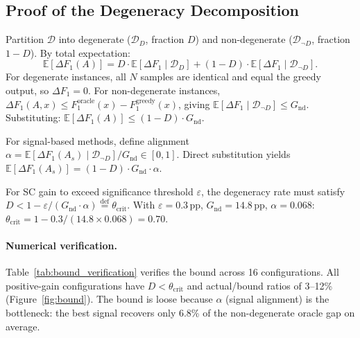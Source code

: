 \subsection{Proof of the Degeneracy Decomposition}

Partition $\mathcal{D}$ into degenerate ($\mathcal{D}_D$, fraction $D$) and non-degenerate ($\mathcal{D}_{\neg D}$, fraction $1{-}D$). By total expectation:
\begin{equation}\label{eq:bound_decomp}
\mathbb{E}[\Delta F_1(A)] = D \cdot \mathbb{E}[\Delta F_1 \mid \mathcal{D}_D] + (1{-}D) \cdot \mathbb{E}[\Delta F_1 \mid \mathcal{D}_{\neg D}].
\end{equation}
For degenerate instances, all $N$ samples are identical and equal the greedy output, so $\Delta F_1 = 0$. For non-degenerate instances, $\Delta F_1(A,x) \leq F_1^{\text{oracle}}(x) - F_1^{\text{greedy}}(x)$, giving $\mathbb{E}[\Delta F_1 \mid \mathcal{D}_{\neg D}] \leq G_{\text{nd}}$. Substituting: $\mathbb{E}[\Delta F_1(A)] \leq (1{-}D) \cdot G_{\text{nd}}$.

For signal-based methods, define alignment $\alpha = \mathbb{E}[\Delta F_1(A_s) \mid \mathcal{D}_{\neg D}] / G_{\text{nd}} \in [0,1]$. Direct substitution yields $\mathbb{E}[\Delta F_1(A_s)] = (1{-}D) \cdot G_{\text{nd}} \cdot \alpha$.

\begin{corollary}\label{cor:theta_crit}
For SC gain to exceed significance threshold $\varepsilon$, the degeneracy rate must satisfy $D < 1 - \varepsilon / (G_{\text{nd}} \cdot \alpha) \stackrel{\text{def}}{=} \theta_{\text{crit}}$.
With $\varepsilon{=}0.3$\,pp, $G_{\text{nd}}{=}14.8$\,pp, $\alpha{=}0.068$: $\theta_{\text{crit}} = 1 - 0.3/(14.8 \times 0.068) = 0.70$.
\end{corollary}

\paragraph{Numerical verification.}
Table~\ref{tab:bound_verification} verifies the bound across 16 configurations. All positive-gain configurations have $D < \theta_{\text{crit}}$ and actual/bound ratios of 3--12\% (Figure~\ref{fig:bound}). The bound is loose because $\alpha$ (signal alignment) is the bottleneck: the best signal recovers only 6.8\% of the non-degenerate oracle gap on average.


